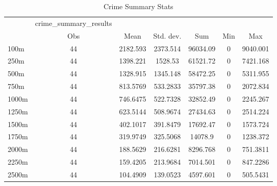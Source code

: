 \begin{table}[htbp]\centering
\caption{Crime Summary Stats}
\begin{tabular}{l*{6}{c}}
\hline\hline
                    &crime\_summary\_results&            &            &            &            &            \\
                    &         Obs&        Mean&   Std. dev.&         Sum&         Min&         Max\\
\hline
100m                &          44&    2182.593&    2373.514&    96034.09&           0&    9040.001\\
250m                &          44&    1398.221&     1528.53&    61521.72&           0&    7421.168\\
500m                &          44&    1328.915&    1345.148&    58472.25&           0&    5311.955\\
750m                &          44&    813.5769&    533.2833&    35797.38&           0&    2072.834\\
1000m               &          44&    746.6475&    522.7328&    32852.49&           0&    2245.267\\
1250m               &          44&    623.5144&    508.9674&    27434.63&           0&    2514.224\\
1500m               &          44&    402.1017&    391.8479&    17692.47&           0&    1573.724\\
1750m               &          44&    319.9749&    325.5068&     14078.9&           0&    1238.372\\
2000m               &          44&    188.5629&    216.6281&    8296.768&           0&    751.3811\\
2250m               &          44&    159.4205&    213.9684&    7014.501&           0&    847.2286\\
2500m               &          44&    104.4909&    139.0523&    4597.601&           0&    505.5431\\
\hline\hline
\end{tabular}
\end{table}
